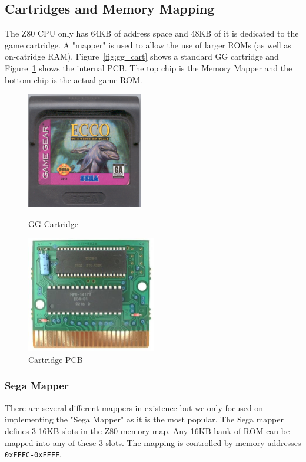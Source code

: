\documentclass{article}
\begin{document}
\newpage
\subsection{Cartridges and Memory Mapping}
The Z80 CPU only has 64KB of address space and 48KB of it is dedicated to the
game cartridge. A "mapper" is used to allow the use of larger ROMs (as well as
on-catridge RAM). Figure~\ref{fig:gg_cart} shows a standard GG cartridge and
Figure~\ref{fig:gg_cart_pcb} shows the internal PCB. The top chip is the Memory
Mapper and the bottom chip is the actual game ROM.

\begin{figure}[H]
    \centering
    \begin{minipage}[b]{0.3\linewidth}
        \centering
        \includegraphics[height=2in]{../images/gg_cart.png}
        \caption{GG Cartridge \protect\cite{gg_cart}}
        \label{fig:gg_cart}
    \end{minipage}
    \hspace{1.5cm}
    \begin{minipage}[b]{0.3\linewidth}
        \centering
        \includegraphics[height=2in]{../images/gg_cart_pcb.png}
        \caption{Cartridge PCB \protect\cite{gg_cart_pcb}}
        \label{fig:gg_cart_pcb}
    \end{minipage}
\end{figure}

\subsubsection{Sega Mapper}
There are several different mappers in existence but we only focused on
implementing the "Sega Mapper" as it is the most popular.  The Sega mapper
defines 3 16KB slots in the Z80 memory map. Any 16KB bank of ROM can be mapped
into any of these 3 slots. The mapping is controlled by memory addresses
\texttt{0xFFFC-0xFFFF}.
\end{document}
